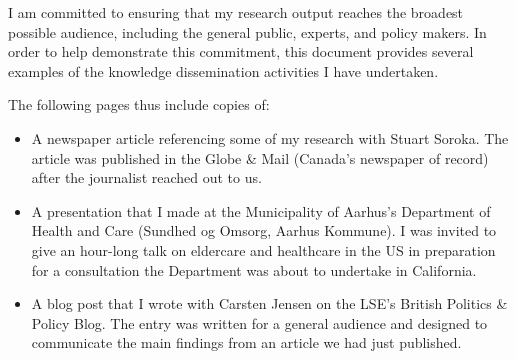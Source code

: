 \documentclass[letterpaper]{scrartcl}
\begin{document}
  I am committed to ensuring that my research output reaches the broadest possible audience, including the general public, experts, and policy makers. In order to help demonstrate this commitment, this document provides several examples of the knowledge dissemination activities I have undertaken.

  The following pages thus include copies of:\\[-4ex]

  \begin{itemize}
    \item A newspaper article referencing some of my research with Stuart Soroka. The article was published in the Globe \& Mail (Canada's newspaper of record) after the journalist reached out to us. \\[-4ex]
    \item A presentation that I made at the Municipality of Aarhus's Department of Health and Care (Sundhed og Omsorg, Aarhus Kommune). I was invited to give an hour-long talk on eldercare and healthcare in the US in preparation for a consultation the Department was about to undertake in California. \\[-4ex]
    \item A blog post that I wrote with Carsten Jensen on the LSE's British Politics \& Policy Blog. The entry was written for a general audience and designed to communicate the main findings from an article we had just published.
  \end{itemize}

  
\end{document}
